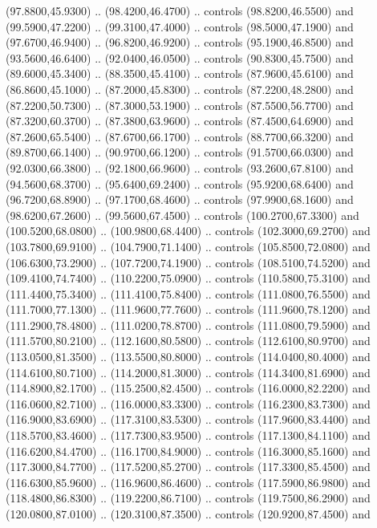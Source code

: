 {\begin{scope}[y=0.80pt, x=0.80pt, yscale=-1, xscale=1, inner sep=0pt, outer sep=0pt, #1]
      (97.8800,45.9300) .. (98.4200,46.4700) .. controls (98.8200,46.5500) and
      (99.5900,47.2200) .. (99.3100,47.4000) .. controls (98.5000,47.1900) and
      (97.6700,46.9400) .. (96.8200,46.9200) .. controls (95.1900,46.8500) and
      (93.5600,46.6400) .. (92.0400,46.0500) .. controls (90.8300,45.7500) and
      (89.6000,45.3400) .. (88.3500,45.4100) .. controls (87.9600,45.6100) and
      (86.8600,45.1000) .. (87.2000,45.8300) .. controls (87.2200,48.2800) and
      (87.2200,50.7300) .. (87.3000,53.1900) .. controls (87.5500,56.7700) and
      (87.3200,60.3700) .. (87.3800,63.9600) .. controls (87.4500,64.6900) and
      (87.2600,65.5400) .. (87.6700,66.1700) .. controls (88.7700,66.3200) and
      (89.8700,66.1400) .. (90.9700,66.1200) .. controls (91.5700,66.0300) and
      (92.0300,66.3800) .. (92.1800,66.9600) .. controls (93.2600,67.8100) and
      (94.5600,68.3700) .. (95.6400,69.2400) .. controls (95.9200,68.6400) and
      (96.7200,68.8900) .. (97.1700,68.4600) .. controls (97.9900,68.1600) and
      (98.6200,67.2600) .. (99.5600,67.4500) .. controls (100.2700,67.3300) and
      (100.5200,68.0800) .. (100.9800,68.4400) .. controls (102.3000,69.2700) and
      (103.7800,69.9100) .. (104.7900,71.1400) .. controls (105.8500,72.0800) and
      (106.6300,73.2900) .. (107.7200,74.1900) .. controls (108.5100,74.5200) and
      (109.4100,74.7400) .. (110.2200,75.0900) .. controls (110.5800,75.3100) and
      (111.4400,75.3400) .. (111.4100,75.8400) .. controls (111.0800,76.5500) and
      (111.7000,77.1300) .. (111.9600,77.7600) .. controls (111.9600,78.1200) and
      (111.2900,78.4800) .. (111.0200,78.8700) .. controls (111.0800,79.5900) and
      (111.5700,80.2100) .. (112.1600,80.5800) .. controls (112.6100,80.9700) and
      (113.0500,81.3500) .. (113.5500,80.8000) .. controls (114.0400,80.4000) and
      (114.6100,80.7100) .. (114.2000,81.3000) .. controls (114.3400,81.6900) and
      (114.8900,82.1700) .. (115.2500,82.4500) .. controls (116.0000,82.2200) and
      (116.0600,82.7100) .. (116.0000,83.3300) .. controls (116.2300,83.7300) and
      (116.9000,83.6900) .. (117.3100,83.5300) .. controls (117.9600,83.4400) and
      (118.5700,83.4600) .. (117.7300,83.9500) .. controls (117.1300,84.1100) and
      (116.6200,84.4700) .. (116.1700,84.9000) .. controls (116.3000,85.1600) and
      (117.3000,84.7700) .. (117.5200,85.2700) .. controls (117.3300,85.4500) and
      (116.6300,85.9600) .. (116.9600,86.4600) .. controls (117.5900,86.9800) and
      (118.4800,86.8300) .. (119.2200,86.7100) .. controls (119.7500,86.2900) and
      (120.0800,87.0100) .. (120.3100,87.3500) .. controls (120.9200,87.4500) and

\end{scope}}
